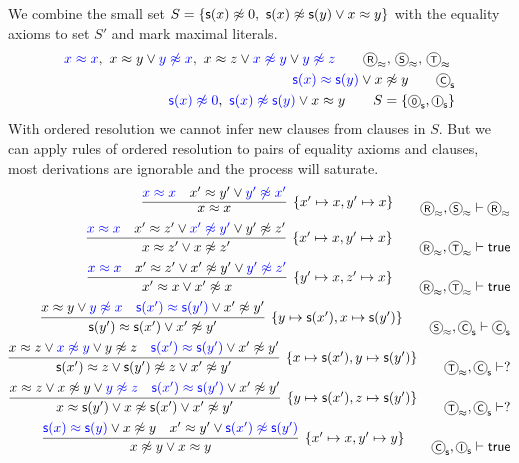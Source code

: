 \begin{example}\label{ex:nat:ordres}
	We combine the small set 
	\( S = \{ \msucc(x)\mNE 0,{\ }\msucc(x)\mNE\msucc(y)\lor x\mEQ y \} \) 
	with the equality axioms to set \( S' \) and mark maximal literals.
	\begin{align*}
	{\colN x \mEQ x},\
	x \mEQ y \lor {\colN y \mNE x},\
	x \mEQ z \lor {\colN x \mNE y} \lor {\colN y\mNE z}
\tag*{\(\axiom{R}_\mEQ,\,\axiom{S}_\mEQ,\,\axiom{T}_\mEQ \) }
\\
	{\colN \msucc(x) \mEQ \msucc(y)} \lor x\mNE y
	\tag*{\(\axiom{C}_\msucc \)}
\\
	{\colN \msucc(x)\mNE 0},\
	{\colN \msucc(x) \mNE \msucc(y)} \lor x \mEQ y
\tag*{\( S = \{ \axiom{0}_\msucc, \axiom{I}_\msucc \} \)}
	\end{align*}
	With ordered resolution we cannot infer new clauses from clauses in \( S \).
	But we can apply rules of ordered resolution to pairs of equality axioms and clauses,
	most derivations are ignorable and the process will saturate.
	\begin{align*}
\infer[ \{ x'\mapsto x, y'\mapsto x\}]
{x \mEQ x}
{{\colN x \mEQ x} & x' \mEQ y' \lor {\colN y' \mNE x'}}
\tag*{\( \axiom{R}_\mEQ,\axiom{S}_\mEQ\proves \axiom{R}_\mEQ\)}
\\
\infer[ \{ x'\mapsto x,y'\mapsto x \}]
{x\mEQ z'\lor x\mNE z' }
{{\colN x \mEQ x} & x' \mEQ z' \lor {\colN x' \mNE y'} \lor {y'\mNE z'}}
\tag*{\( \axiom{R}_\mEQ,\axiom{T}_\mEQ\proves\true \)}
\\
\infer[ \{ y'\mapsto x, z'\mapsto x \}]
{x'\mEQ x\lor x'\mNE x }
{{\colN x \mEQ x} & x' \mEQ z' \lor {x' \mNE y'} \lor {\colN y'\mNE z'}}
\tag*{\( \axiom{R}_\mEQ, \axiom{T}_\mEQ\proves\true \)}
\\
\infer[ \{ y\mapsto \msucc(x'), x\mapsto\msucc(y')\}]
{\msucc(y')\mEQ\msucc(x')\lor x'\mNE y'}
{x \mEQ y \lor {\colN y \mNE x} & {\colN \msucc(x') \mEQ \msucc(y')} \lor x'\mNE y'}
\tag*{\( \axiom{S}_\mEQ,\axiom{C}_\msucc\proves \axiom{C}_\msucc \)}
\\
\infer[ \{ x\mapsto\msucc(x'),y\mapsto\msucc(y')\}]
{\msucc(x')\mEQ z\lor \msucc(y')\mNE z \lor x'\mNE y'}
{x \mEQ z \lor {\colN x \mNE y} \lor {y\mNE z} & {\colN \msucc(x') \mEQ \msucc(y')} \lor x'\mNE y'}
\tag*{\( \axiom{T}_\mEQ,\axiom{C}_\msucc\proves ? \)}
\\
\infer[ \{ y\mapsto\msucc(x'),z\mapsto\msucc(y')\}]
{x\mEQ\msucc(y')\lor x\mNE\msucc(x')\lor x'\mNE y'}
{x \mEQ z \lor {x \mNE y} \lor {\colN y\mNE z} & {\colN \msucc(x') \mEQ \msucc(y')} \lor x'\mNE y'}
\tag*{\( \axiom{T}_\mEQ,\axiom{C}_\msucc\proves ? \)}
\\
\infer[ \{ x'\mapsto x, y'\mapsto y\}]
{x\mNE y\lor x\mEQ y}
{{\colN \msucc(x) \mEQ \msucc(y)} \lor x\mNE y & x' \mEQ y' \lor {\colN \msucc(x') \mNE \msucc(y')}}
\tag*{\( \axiom{C}_\msucc,\axiom{I}_\msucc\proves\true \)}
\\
	\end{align*}
\end{example}

